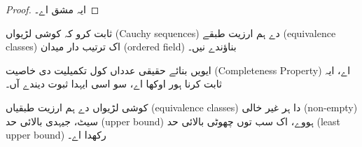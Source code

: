 \documentclass[../../../include/open-logic-section]{subfiles}
\begin{document}
\begin{proof}
ایہ مشق اے۔
\end{proof}

\begin{prob}
ثابت کرو کہ کوشی لڑیواں (Cauchy sequences) دے ہم ارزیت طبقے
(equivalence classes) اک ترتیب دار میدان (ordered field) بناؤندے نیں۔
\end{prob}

ایویں بنائے حقیقی عدداں کول تکمیلیت دی خاصیت (Completeness Property) اے،
ایہ ثابت کرنا ہور اوکھا اے، سو اسی ایہدا ثبوت دیندے آں۔

\begin{thm}
کوشی لڑیواں دے ہم ارزیت طبقیاں (equivalence classes) دا ہر غیر خالی
(non-empty) سیٹ، جیہدی بالائی حد (upper bound) ہووے، اک سب توں چھوٹی
بالائی حد (least upper bound) رکھدا اے۔
\end{thm}
\end{document}
